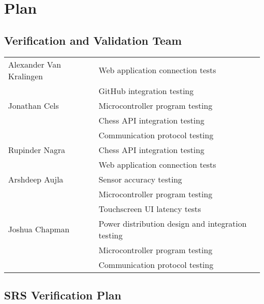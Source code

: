 \documentclass[12pt, titlepage]{article}
\begin{document}
\section{Plan}


\subsection{Verification and Validation Team}

\begin{tabular}{ |p{4.5cm}||p{9cm}|  }
 \hline
 Alexander Van Kralingen & Web application connection tests\\
 & GitHub integration testing\\
 \hline
 Jonathan Cels & Microcontroller program testing\\
 & Chess API integration testing\\
 & Communication protocol testing\\
 \hline
 Rupinder Nagra & Chess API integration testing\\ 
 & Web application connection tests\\
 \hline
 Arshdeep Aujla & Sensor accuracy testing\\
 & Microcontroller program testing\\
 & Touchscreen UI latency tests\\
 \hline
 Joshua Chapman& Power distribution design and integration testing\\
 & Microcontroller program testing\\
 & Communication protocol testing\\
 \hline
\end{tabular}

\subsection{SRS Verification Plan}


\end{document}
